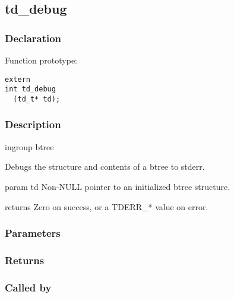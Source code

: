 
\newpage
\subsection{td\_debug}
\subsubsection{Declaration} Function prototype:

\begin{verbatim}
extern
int td_debug
  (td_t* td);
\end{verbatim}

\subsubsection{Description}


 ingroup btree

 Debugs the structure and contents of a btree to stderr.

 param td Non-NULL pointer to an initialized btree structure.

 returns Zero on success, or a TDERR\_* value on error.
 

\subsubsection{Parameters}
\subsubsection{Returns}
\subsubsection{Called by}
